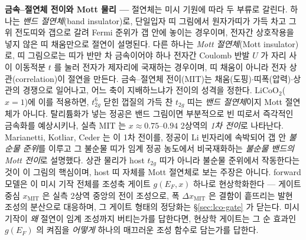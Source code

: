 \begin{bgbox}
\textbf{금속--절연체 전이와 Mott 물리 ---} 절연체는 미시 기원에 따라 두 부류로 갈린다. 하나는
\emph{밴드 절연체}(band insulator)로, 단일입자 띠 그림에서 원자가띠가 가득 차고 그 위 전도띠와 갭으로 갈려
Fermi 준위가 갭 안에 놓이는 경우이며, 전자간 상호작용을 넣지 않은 띠 채움만으로 절연이 설명된다. 다른 하나는
\emph{Mott 절연체}(Mott insulator)로, 띠 그림으로는 띠가 반만 차 금속이어야 하나 전자간 Coulomb 반발 $U$ 가
자리 사이 이동적분 $t$ 를 눌러 전자가 제자리에 국재하는 경우이며, 띠 채움이 아니라 전자 상관(correlation)이
절연을 만든다\cite{mott1968,imada1998}. 금속--절연체 전이(MIT)는 채움(도핑)$\cdot$띠폭(압력)$\cdot$상관의
경쟁으로 일어나고, 어느 축이 지배하느냐가 전이의 성격을 정한다\cite{imada1998}. $\mathrm{LiCoO_2}$($x{=}1$)에
이를 적용하면, $t_{2g}^6$ 닫힌 껍질의 가득 찬 $t_{2g}$ 띠는 \emph{밴드 절연체}이지 Mott 절연체가 아니다\cite{menetrier1999}.
탈리튬화가 넣는 정공은 밴드 그림이면 부분적으로 빈 띠로서 즉각적인 금속화를 예상시키나, 실측 MIT 는
$x\approx0.75$--$0.94$ 2상역의 \emph{1차 전이}로 나타난다\cite{menetrier1999,reimers1992,motohashi2009}.
Marianetti, Kotliar, Ceder 는 이 1차 전이를, 정공이 Li 빈자리에 속박되어 갭 안 \emph{불순물 준위}를 이루고 그
불순물 띠가 임계 정공 농도에서 비국재화하는 \emph{불순물 밴드의 Mott 전이}로 설명했다\cite{marianetti2004}.
상관 물리가 host $t_{2g}$ 띠가 아니라 불순물 준위에서 작동한다는 것이 이 그림의 핵심이며, host 띠 자체를
Mott 절연체로 보는 주장은 아니다. forward 모델은 이 미시 기작 전체를 조성축 게이트 $g(E_F,x)$ 하나로
현상학화한다 --- 게이트 중심 $x_\mathrm{MIT}$ 은 실측 2상역 중앙의 전이 조성으로, 폭 $\Delta x_\mathrm{MIT}$ 은
결함이 흩뜨리는 발현 조성의 분산으로 대응하며, 그 게이트 형태의 정당화는 \S\ref{sec:lco-gate} 가 닫는다. 미시
기작이 \emph{왜} 절연이 임계 조성까지 버티는가를 답한다면, 현상학 게이트는 그 순 효과인 $g(E_F)$ 의 켜짐을
\emph{어떻게} 하나의 매끄러운 조성 함수로 담는가를 답한다.
\end{bgbox}

